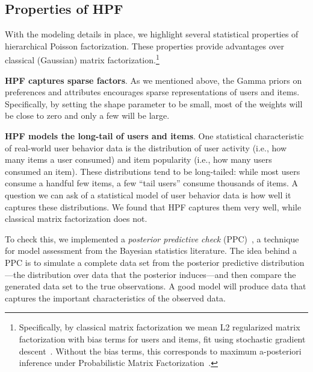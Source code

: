 \subsection{Properties of HPF}

With the modeling details in place, we highlight several statistical
properties of hierarchical Poisson factorization.  These properties
provide advantages over classical (Gaussian) matrix
factorization.\footnote{Specifically, by classical matrix
  factorization we mean L2 regularized matrix factorization with
  bias terms for users and items, fit using stochastic gradient
  descent~\cite{Koren:2009}. Without the bias terms, this corresponds
  to maximum a-posteriori inference under Probabilistic Matrix
  Factorization~\cite{Salakhutdinov:2008a}.}

{\bf HPF captures sparse factors}.  As we mentioned above, the Gamma
priors on preferences and attributes encourages sparse representations
of users and items.  Specifically, by setting the shape parameter to
be small, most of the weights will be close to zero and only a few
will be large.


{\bf HPF models the long-tail of users and items}.  One statistical
characteristic of real-world user behavior data is the distribution of
user activity (i.e., how many items a user consumed) and item
popularity (i.e., how many users consumed an item).  These
distributions tend to be long-tailed: while most users consume a
handful few items, a few ``tail users'' consume thousands of items.  A
question we can ask of a statistical model of user behavior data is
how well it captures these distributions.  We found that HPF captures
them very well, while classical matrix factorization does not.

To check this, we implemented a \textit{posterior predictive check}
(PPC)~\cite{Rubin:1984,Gelman:1996}, a technique for model assessment
from the Bayesian statistics literature.  The idea behind a PPC is to
simulate a complete data set from the posterior predictive
distribution---the distribution over data that the posterior
induces---and then compare the generated data set to the true
observations. A good model will produce data that captures the
important characteristics of the observed data.


